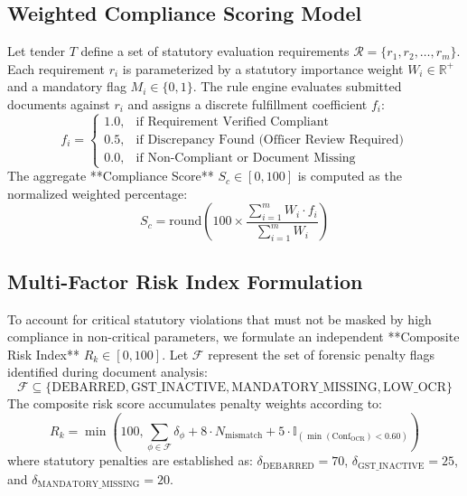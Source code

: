 \documentclass[conference]{IEEEtran}
\begin{document}
\subsection{Weighted Compliance Scoring Model}
Let tender $T$ define a set of statutory evaluation requirements $\mathcal{R} = \{r_1, r_2, \dots, r_m\}$. Each requirement $r_i$ is parameterized by a statutory importance weight $W_i \in \mathbb{R}^+$ and a mandatory flag $M_i \in \{0, 1\}$. The rule engine evaluates submitted documents against $r_i$ and assigns a discrete fulfillment coefficient $f_i$:
\begin{equation}
f_i = \begin{cases}
1.0, & \text{if Requirement Verified Compliant} \\
0.5, & \text{if Discrepancy Found (Officer Review Required)} \\
0.0, & \text{if Non-Compliant or Document Missing}
\end{cases}
\end{equation}
The aggregate **Compliance Score** $S_c \in [0, 100]$ is computed as the normalized weighted percentage:
\begin{equation}
S_c = \text{round}\left(100 \times \frac{\sum_{i=1}^m W_i \cdot f_i}{\sum_{i=1}^m W_i}\right)
\end{equation}

\subsection{Multi-Factor Risk Index Formulation}
To account for critical statutory violations that must not be masked by high compliance in non-critical parameters, we formulate an independent **Composite Risk Index** $R_k \in [0, 100]$. Let $\mathcal{F}$ represent the set of forensic penalty flags identified during document analysis:
\begin{equation}
\mathcal{F} \subseteq \{\text{DEBARRED}, \text{GST\_INACTIVE}, \text{MANDATORY\_MISSING}, \text{LOW\_OCR}\}
\end{equation}
The composite risk score accumulates penalty weights according to:
\begin{equation}
R_k = \min\left(100, \sum_{\phi \in \mathcal{F}} \delta_\phi + 8 \cdot N_{\text{mismatch}} + 5 \cdot \mathbb{I}_{(\min(\text{Conf}_{\text{OCR}}) < 0.60)}\right)
\end{equation}
where statutory penalties are established as: $\delta_{\text{DEBARRED}} = 70$, $\delta_{\text{GST\_INACTIVE}} = 25$, and $\delta_{\text{MANDATORY\_MISSING}} = 20$. 
\end{document}

